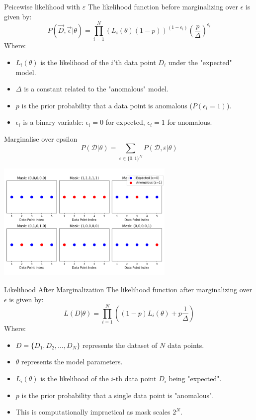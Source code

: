 \documentclass[aspectratio=169]{beamer}
\begin{document}
\begin{frame}{Peicewise likelihood with $\varepsilon$}
    \centering
    The likelihood function before marginalizing over $\epsilon$ is given by:
    $$P(\vec{D}, \vec{\epsilon} | \theta) = \prod_{i=1}^{N} \left(L_i(\theta) (1-p)\right)^{(1-\epsilon_i)} \left(\frac{p}{\Delta}\right)^{\epsilon_i}$$
    Where:
    \begin{itemize}
        \item $L_i(\theta)$ is the likelihood of the $i$'th data point $D_i$ under the "expected" model.
        \item $\Delta$ is a constant related to the "anomalous" model.
        \item $p$ is the prior probability that a data point is anomalous ($P(\epsilon_i = 1)$).
        \item $\epsilon_i$ is a binary variable: $\epsilon_i = 0$ for expected, $\epsilon_i = 1$ for anomalous.
    \end{itemize}
\end{frame}

\begin{frame}{Marginalise over epsilon}
  \footnotesize
  \begin{equation}
      P(\mathcal{D} | \theta) =\sum_{\varepsilon \in \{ 0, 1 \} ^N}P(\mathcal{D},\varepsilon|\theta)
  \end{equation}
  \begin{center}
    \includegraphics[width=0.64\textwidth]{images/marginalize_epsilon_plot.png}
  \end{center}
\end{frame}
\begin{frame}{Likelihood After Marginalization}
    \centering
    The likelihood function after marginalizing over $\epsilon$ is given by:
    $$L(D | \theta) = \prod_{i=1}^{N} \left( (1-p) L_i(\theta) + p \frac{1}{\Delta} \right)$$
    Where:
    \begin{itemize}
        \item $D = \{D_1, D_2, \dots, D_N\}$ represents the dataset of $N$ data points.
        \item $\theta$ represents the model parameters.
        \item $L_i(\theta)$ is the likelihood of the $i$-th data point $D_i$ being "expected".
        \item $p$ is the prior probability that a single data point is "anomalous".
        \item This is computationally impractical as mask scales $2^N$.
    \end{itemize}
\end{frame}
\end{document}
